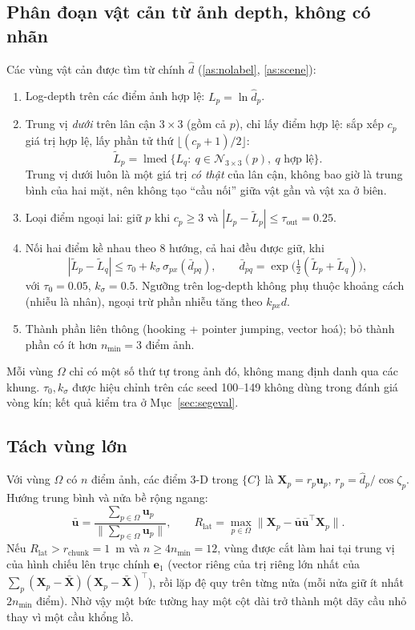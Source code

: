 \documentclass[11pt,a4paper]{article}
\numberwithin{equation}{section}
\newcommand{\vb}[1]{\bm{#1}}
\newcommand{\T}{^{\!\top}}
\theoremstyle{definition}
\theoremstyle{plain}
\theoremstyle{remark}
\begin{document}
\subsection{Phân đoạn vật cản từ ảnh depth, không có nhãn}
\label{sec:seg}
Các vùng vật cản được tìm từ chính $\hat d$ (\ref{as:nolabel}, \ref{as:scene}):
\begin{enumerate}
\item Log-depth trên các điểm ảnh hợp lệ: $L_p=\ln\hat d_p$.
\item Trung vị \emph{dưới} trên lân cận $3\times3$ (gồm cả $p$), chỉ lấy điểm hợp lệ: sắp xếp $c_p$ giá trị hợp lệ, lấy phần tử thứ $\lfloor(c_p+1)/2\rfloor$:
\begin{equation}
\tilde L_p=\operatorname{lmed}\{L_q:\ q\in\mathcal N_{3\times3}(p),\ q\text{ hợp lệ}\}. \label{eq:lmed}
\end{equation}
Trung vị dưới luôn là một giá trị \emph{có thật} của lân cận, không bao giờ là trung bình của hai mặt, nên không tạo ``cầu nối'' giữa vật gần và vật xa ở biên.
\item Loại điểm ngoại lai: giữ $p$ khi $c_p\ge3$ và $|L_p-\tilde L_p|\le\tau_{\text{out}}=0.25$.
\item Nối hai điểm kề nhau theo 8 hướng, cả hai đều được giữ, khi
\begin{equation}
|\tilde L_p-\tilde L_q|\le\tau_0+k_\sigma\,\sigma_{px}(\bar d_{pq}),\qquad \bar d_{pq}=\exp\!\big(\tfrac12(\tilde L_p+\tilde L_q)\big), \label{eq:segedge}
\end{equation}
với $\tau_0=0.05$, $k_\sigma=0.5$. Ngưỡng trên log-depth không phụ thuộc khoảng cách (nhiễu là nhân), ngoại trừ phần nhiễu tăng theo $k_{px}d$.
\item Thành phần liên thông (hooking + pointer jumping, vector hoá); bỏ thành phần có ít hơn $n_{\min}=3$ điểm ảnh.
\end{enumerate}
Mỗi vùng $\Omega$ chỉ có một số thứ tự trong ảnh đó, không mang định danh qua các khung. $\tau_0,k_\sigma$ được hiệu chỉnh trên các seed 100--149 không dùng trong đánh giá vòng kín; kết quả kiểm tra ở Mục~\ref{sec:segeval}.

\subsection{Tách vùng lớn}
\label{sec:split}
Với vùng $\Omega$ có $n$ điểm ảnh, các điểm 3-D trong $\{C\}$ là $\vb X_p=r_p\vb u_p$, $r_p=\hat d_p/\cos\zeta_p$. Hướng trung bình và nửa bề rộng ngang:
\begin{equation}
\bar{\vb u}=\frac{\sum_{p\in\Omega}\vb u_p}{\|\sum_{p\in\Omega}\vb u_p\|},\qquad
R_{\text{lat}}=\max_{p\in\Omega}\big\|\vb X_p-\bar{\vb u}\bar{\vb u}\T\vb X_p\big\|. \label{eq:rlat}
\end{equation}
Nếu $R_{\text{lat}}>r_{\text{chunk}}=1$~m và $n\ge4n_{\min}=12$, vùng được cắt làm hai tại trung vị của hình chiếu lên trục chính $\vb e_1$ (vector riêng của trị riêng lớn nhất của $\sum_p(\vb X_p-\bar{\vb X})(\vb X_p-\bar{\vb X})\T$), rồi lặp đệ quy trên từng nửa (mỗi nửa giữ ít nhất $2n_{\min}$ điểm). Nhờ vậy một bức tường hay một cột dài trở thành một dãy cầu nhỏ thay vì một cầu khổng lồ.
\end{document}
